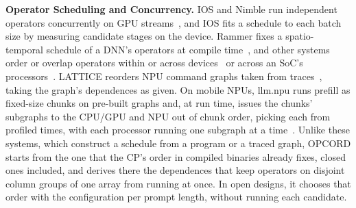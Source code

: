 \textbf{Operator Scheduling and Concurrency.}
IOS and Nimble run independent operators concurrently on GPU streams~\citep{ding2021ios,kwon2020nimble}, and IOS fits a schedule to each batch size by measuring candidate stages on the device.
Rammer fixes a spatio-temporal schedule of a DNN's operators at compile time~\citep{ma2020rammer}, and other systems order or overlap operators within or across devices~\citep{barham2022pathways,pan2026dynaflow,jax-pgle,zhu2025nanoflow,gandhi2026dataflow} or across an SoC's processors~\citep{jun2026heteromosaic,wei2025agentxpu}.
LATTICE reorders NPU command graphs taken from traces~\citep{liu2026lattice}, taking the graph's dependences as given.
On mobile NPUs, llm.npu runs prefill as fixed-size chunks on pre-built graphs and, at run time, issues the chunks' subgraphs to the CPU/GPU and NPU out of chunk order, picking each from profiled times, with each processor running one subgraph at a time~\citep{xu2025llmnpu}.
Unlike these systems, which construct a schedule from a program or a traced graph, OPCORD starts from the one that the CP's order in compiled binaries already fixes, closed ones included, and derives there the dependences that keep operators on disjoint column groups of one array from running at once.
In open designs, it chooses that order with the configuration per prompt length, without running each candidate.

